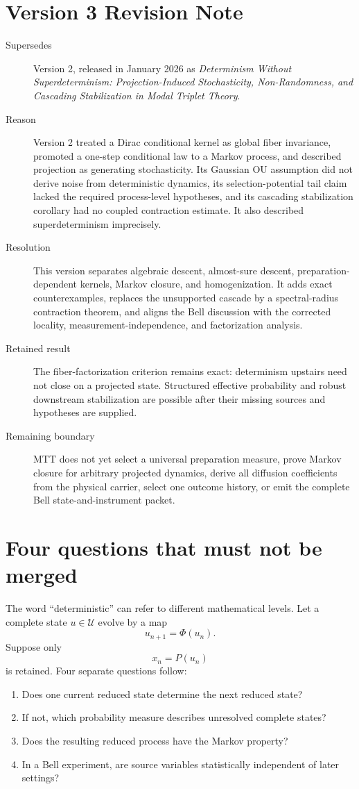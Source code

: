 \documentclass[11pt]{article}
\newcommand{\Uu}{\mathcal U}
\begin{document}
\section*{Version 3 Revision Note}
\begin{description}
\item[Supersedes] Version 2, released in January 2026 as
\emph{Determinism Without Superdeterminism: Projection-Induced
Stochasticity, Non-Randomness, and Cascading Stabilization in Modal Triplet
Theory}.
\item[Reason] Version 2 treated a Dirac conditional kernel as global fiber
invariance, promoted a one-step conditional law to a Markov process, and
described projection as generating stochasticity. Its Gaussian OU assumption
did not derive noise from deterministic dynamics, its selection-potential
tail claim lacked the required process-level hypotheses, and its cascading
stabilization corollary had no coupled contraction estimate. It also described
superdeterminism imprecisely.
\item[Resolution] This version separates algebraic descent, almost-sure
descent, preparation-dependent kernels, Markov closure, and homogenization. It
adds exact counterexamples, replaces the unsupported cascade by a
spectral-radius contraction theorem, and aligns the Bell discussion with the
corrected locality, measurement-independence, and factorization analysis.
\item[Retained result] The fiber-factorization criterion remains exact:
determinism upstairs need not close on a projected state. Structured
effective probability and robust downstream stabilization are possible after
their missing sources and hypotheses are supplied.
\item[Remaining boundary] MTT does not yet select a universal preparation
measure, prove Markov closure for arbitrary projected dynamics, derive all
diffusion coefficients from the physical carrier, select one outcome history,
or emit the complete Bell state-and-instrument packet.
\end{description}

\tableofcontents

\section{Four questions that must not be merged}

The word ``deterministic'' can refer to different mathematical levels. Let a
complete state \(u\in\Uu\) evolve by a map
\[
u_{n+1}=\Phi(u_n).
\]
Suppose only
\[
x_n=P(u_n)
\]
is retained. Four separate questions follow:
\begin{enumerate}
\item Does one current reduced state determine the next reduced state?
\item If not, which probability measure describes unresolved complete states?
\item Does the resulting reduced process have the Markov property?
\item In a Bell experiment, are source variables statistically independent of
later settings?
\end{enumerate}
\end{document}
